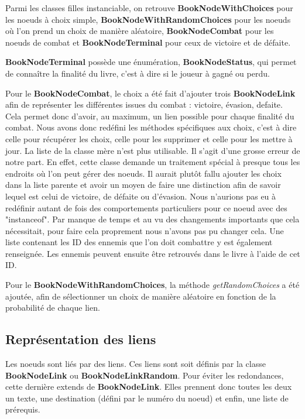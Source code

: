 			Parmi les classes filles instanciable, on retrouve \textbf{BookNodeWithChoices} pour les noeuds à choix simple, \textbf{BookNodeWithRandomChoices} pour les noeuds où l'on prend un choix de manière aléatoire, \textbf{BookNodeCombat} pour les noeuds de combat et \textbf{BookNodeTerminal} pour ceux de victoire et de défaite.

			\textbf{BookNodeTerminal} possède une énumération, \textbf{BookNodeStatus}, qui permet de connaître la finalité du livre, c'est à dire si le joueur à gagné ou perdu.

			Pour le \textbf{BookNodeCombat}, le choix a été fait d'ajouter trois \textbf{BookNodeLink} afin de représenter les différentes issues du combat : victoire, évasion, defaite. Cela permet donc d'avoir, au maximum, un lien possible pour chaque finalité du combat. Nous avons donc redéfini les méthodes spécifiques aux choix, c'est à dire celle pour récupérer les choix, celle pour les supprimer et celle pour les mettre à jour. La liste de la classe mère n'est plus utilisable. Il s'agit d'une grosse erreur de notre part. En effet, cette classe demande un traitement spécial à presque tous les endroits où l'on peut gérer des noeuds. Il aurait plutôt fallu ajouter les choix dans la liste parente et avoir un moyen de faire une distinction afin de savoir lequel est celui de victoire, de défaite ou d'évasion. Nous n'aurions pas eu à redéfinir autant de fois des comportements particuliers pour ce noeud avec des "instanceof". Par manque de temps et au vu des changements importants que cela nécessitait, pour faire cela proprement nous n'avons pas pu changer cela. Une liste contenant les ID des ennemis que l'on doit combattre y est également renseignée. Les ennemis peuvent ensuite être retrouvés dans le livre à l'aide de cet ID.

			Pour le \textbf{BookNodeWithRandomChoices}, la méthode \textit{getRandomChoices} a été ajoutée, afin de sélectionner un choix de manière aléatoire en fonction de la probabilité de chaque lien.

		\subsection{Représentation des liens}
			\label{sub:liens}

			Les noeuds sont liés par des liens. Ces liens sont soit définis par la classe \textbf{BookNodeLink} ou \textbf{BookNodeLinkRandom}. Pour éviter les redondances, cette dernière extends de \textbf{BookNodeLink}. Elles prennent donc toutes les deux un texte, une destination (défini par le numéro du noeud) et enfin, une liste de prérequis.


